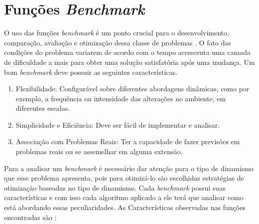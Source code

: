 \section{Funções \textit{Benchmark}}
\label{sec:revisao_benchmark}
O uso das funções \textit{benchmark} é um ponto crucial para o desenvolvimento, comparação, avaliação e otimização dessa classe de problemas \cite{evolution_dynamic}. O fato das condições do problema variarem de acordo com o tempo acrescenta uma camada de dificuldade a mais para obter uma solução satisfatória após uma mudança. Um bom \textit{benchmark} deve possuir as seguintes características.

\begin{enumerate}  
	\item Flexibilidade: Configurável sobre diferentes abordagens dinâmicas, como por exemplo, a frequência ou intensidade das alterações no ambiente, em diferentes escalas.
	
	\item Simplicidade e Eficiência: Deve ser fácil de implementar e analisar.
	
	\item Associação com Problemas Reais: Ter a capacidade de fazer previsões em problemas reais ou se assemelhar em alguma extensão.
\end{enumerate}

Para a analisar um \textit{benchmark} é necessário dar atenção para o tipo de dinamismo que esse problema apresenta, pois para otimizá-lo são escolhidas estratégias de otimização baseadas no tipo de dinamismo. Cada \textit{benchmark} possui suas características e com isso cada algoritmo aplicado a ele terá que analisar como está abordando essas peculiaridades. As Características observadas nas funções encontradas são \cite{cruz2011optimization}:

